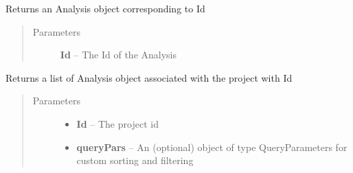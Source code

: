 \documentclass[letterpaper,10pt,english]{sphinxmanual}
\begin{document}
\begin{fulllineitems}
\begin{fulllineitems}
\begin{quote}
\begin{description}
\begin{itemize}
\end{itemize}

\end{description}\end{quote}

\end{fulllineitems}


\begin{fulllineitems}
\label{Available modules:BaseSpacePy.api.BaseSpaceAPI.BaseSpaceAPI.getAnalysisById}
Returns an Analysis object corresponding to Id
\begin{quote}\begin{description}
\item[{Parameters}] \leavevmode
\textbf{Id} -- The Id of the Analysis

\end{description}\end{quote}

\end{fulllineitems}


\begin{fulllineitems}
\label{Available modules:BaseSpacePy.api.BaseSpaceAPI.BaseSpaceAPI.getAnalysisByProject}
Returns a list of Analysis object associated with the project with Id
\begin{quote}\begin{description}
\item[{Parameters}] \leavevmode\begin{itemize}
\item {} 
\textbf{Id} -- The project id

\item {} 
\textbf{queryPars} -- An (optional) object of type QueryParameters for custom sorting and filtering

\end{itemize}

\end{description}\end{quote}

\end{fulllineitems}


\end{fulllineitems}
\end{document}
